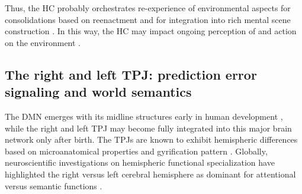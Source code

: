 \documentclass[10pt,letterpaper]{article}
\begin{document}
Thus, the HC probably orchestrates re-experience of environmental aspects for
consolidations based on reenactment and for integration into
rich mental scene construction \citep{deuker2016event, bird2010establishing}.
In this way, the HC may impact
ongoing perception of and action on the environment
\citep{maguire2016, lavilleon2015}.


\subsection{The right and left TPJ: prediction error signaling and world semantics}
The DMN emerges with its midline structures early in human development
\citep{doria2010}, while
the right and left TPJ may become fully integrated into this major brain
network only after birth.
The TPJs are known to exhibit hemispheric differences
based on microanatomical properties and gyrification pattern
\citep{seghier2013angular}.
Globally, neuroscientific investigations on hemispheric functional specialization
have highlighted the right versus left cerebral hemisphere as dominant for
attentional versus semantic functions
\citep{seghier2013angular, bzdok2013tpj, bzdok2016left}.
\end{document}
